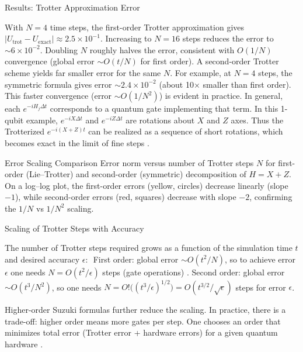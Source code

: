 \documentclass{beamer}
\begin{document}
\begin{frame}{Results: Trotter Approximation Error}

With $N=4$ time steps, the first-order Trotter approximation gives $|U_{\text{trot}} - U_{\text{exact}}| \approx 2.5\times10^{-1}$. Increasing to $N=16$ steps reduces the error to $\sim6\times10^{-2}$. Doubling $N$ roughly halves the error, consistent with $O(1/N)$ convergence (global error $\sim O(t/N)$ for first order).
A second-order Trotter scheme yields far smaller error for the same $N$. For example, at $N=4$ steps, the symmetric formula gives error $\sim2.4\times10^{-2}$ (about 10× smaller than first order). This faster convergence (error $\sim O(1/N^2)$) is evident in practice.
In general, each $e^{-iH_j \Delta t}$ corresponds to a quantum gate implementing that term. In this 1-qubit example, $e^{-iX\Delta t}$ and $e^{-iZ\Delta t}$ are rotations about $X$ and $Z$ axes. Thus the Trotterized $e^{-i(X+Z)t}$ can be realized as a sequence of short rotations, which becomes exact in the limit of fine steps . \end{frame}


\begin{frame}{Error Scaling Comparison}
Error norm versus number of Trotter steps $N$ for first-order (Lie–Trotter) and second-order (symmetric) decomposition of $H=X+Z$. On a log–log plot, the first-order errors (yellow, circles) decrease linearly (slope $-1$), while second-order errors (red, squares) decrease with slope $-2$, confirming the $1/N$ vs $1/N^2$ scaling.
\end{frame}

\begin{frame}{Scaling of Trotter Steps with Accuracy}

The number of Trotter steps required grows as a function of the simulation time $t$ and desired accuracy $\epsilon$: 
First order: global error $\sim O(t^2/N)$, so to achieve error $\epsilon$ one needs $N = O(t^2/\epsilon)$ steps (gate operations) .
Second order: global error $\sim O(t^3/N^2)$, so one needs $N = O!\big((t^3/\epsilon)^{1/2}\big) = O(t^{3/2}/\sqrt{\epsilon})$ steps for error $\epsilon$.

Higher-order Suzuki formulas further reduce the scaling. In practice, there is a trade-off: higher order means more gates per step. One chooses an order that minimizes total error (Trotter error + hardware errors) for a given quantum hardware . \end{frame}
\end{document}
